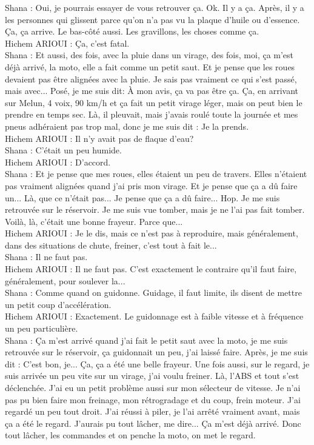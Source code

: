 Shana : Oui, je pourrais essayer de vous retrouver ça. Ok. Il y a ça. Après, il y a les personnes qui glissent parce qu'on n'a pas vu la plaque d'huile ou d'essence. Ça, ça arrive. Le bas-côté aussi. Les gravillons, les choses comme ça. \\
Hichem ARIOUI : Ça, c'est fatal. \\
Shana : Et aussi, des fois, avec la pluie dans un virage, des fois, moi, ça m'est déjà arrivé, la moto, elle a fait comme un petit saut. Et je pense que les roues devaient pas être alignées avec la pluie. Je sais pas vraiment ce qui s'est passé, mais avec... Posé, je me suis dit: À mon avis, ça va pas être ça. Ça, en arrivant sur Melun, 4 voix, 90 km/h et ça fait un petit virage léger, mais on peut bien le prendre en temps sec. Là, il pleuvait, mais j'avais roulé toute la journée et mes pneus adhéraient pas trop mal, donc je me suis dit : Je la prends. \\
Hichem ARIOUI : Il n'y avait pas de flaque d'eau? \\
Shana : C'était un peu humide. \\
Hichem ARIOUI : D'accord. \\
Shana : Et je pense que mes roues, elles étaient un peu de travers. Elles n'étaient pas vraiment alignées quand j'ai pris mon virage. Et je pense que ça a dû faire un... Là, que ce n'était pas... Je pense que ça a dû faire... Hop. Je me suis retrouvée sur le réservoir. Je me suis vue tomber, mais je ne l'ai pas fait tomber. Voilà, là, c'était une bonne frayeur. 
Parce que... \\
Hichem ARIOUI : Je le dis, mais ce n'est pas à reproduire, mais généralement, dans des situations de chute, freiner, c'est tout à fait le... \\
Shana : Il ne faut pas. \\
Hichem ARIOUI : Il ne faut pas. C'est exactement le contraire qu'il faut faire, généralement, pour soulever la... \\
Shana : Comme quand on guidonne. Guidage, il faut limite, ils disent de mettre un petit coup d'accélération. \\
Hichem ARIOUI : Exactement. Le guidonnage est à faible vitesse et à fréquence un peu particulière. \\
Shana : Ça m'est arrivé quand j'ai fait le petit saut avec la moto, je me suis retrouvée sur le réservoir, ça guidonnait un peu, j'ai laissé faire. Après, je me suis dit : C'est bon, je... Ça, ça a été une belle frayeur. Une fois aussi, sur le regard, je suis arrivée un peu vite sur un virage, j'ai voulu freiner. Là, l'ABS et tout s'est déclenchée. J'ai eu un petit problème aussi sur mon sélecteur de vitesse. Je n'ai pas pu bien faire mon freinage, mon rétrogradage et du coup, frein moteur. J'ai regardé un peu tout droit. J'ai réussi à piler, je l'ai arrêté vraiment avant, mais ça a été le regard. J'aurais pu tout lâcher, me dire... Ça m'est déjà arrivé. Donc tout lâcher, les commandes et on penche la moto, on met le regard. \\
